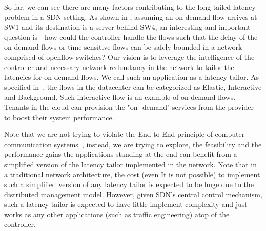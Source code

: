 So far, we can see there are many factors contributing
to the long tailed latency problem in a SDN
setting. 
As shown in , assuming an on-demand flow arrives at SW1 and its destination
is a server behind SW4,
an interesting and important question is---how could the controller handle the flows such that the delay of the on-demand 
flows or time-sensitive flows can be safely bounded in a network comprised of openflow switches?
Our vision is to leverage the intelligence
of the controller and necessary network redundancy in the
network to tailor the latencies for on-demand
flows. 
We call such an application as a latency
tailor. As specified in~\cite{ratul2013achieving}, the flows in the
datacenter can be categorized as Elastic,
Interactive and Background. Such interactive
flow is an example of on-demand flows.
Tenants in the cloud can provision the "on-
demand" services from the provider to boost
their system performance.

Note that we are not trying to violate the End-to-End principle of computer communication
systems~\cite{saltzer1984end}, instead, we are trying to explore,
the feasibility and the performance gains the
applications standing at the end can benefit
from a simplified version of the latency tailor
implemented in the network. Note that in a
traditional network architecture, the cost (even
It is not possible) to implement such a simplified
version of any latency tailor is expected to be
huge due to the distributed management model.
However, given SDN's central control
mechanism, such a latency tailor is expected to
have little implement complexity and just works
as any other applications (such as traffic
engineering) atop of the controller.

